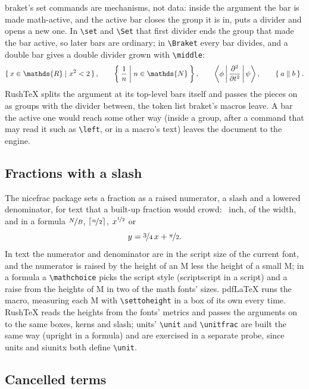 \documentclass{article}
\numberwithin{equation}{section}
\theoremstyle{definition}
\theoremstyle{remark}
\begin{document}
braket's set commands are mechanisms, not data: inside the argument the bar is made
math-active, and the active bar closes the group it is in, puts a divider and opens a new
one. In \verb|\set| and \verb|\Set| that first divider ends the group that made the bar
active, so later bars are ordinary; in \verb|\Braket| every bar divides, and a double bar
gives a double divider grown with \verb|\middle|:
\[ \set{x\in\mathds{R} | x^2<2}, \qquad \Set{\frac{1}{n} | n \in \mathds{N}}, \qquad
   \Braket{\phi | \frac{\partial^2}{\partial t^2} | \psi}, \qquad \Set{a \| b} . \]
RushTeX splits the argument at its top-level bars itself and passes the pieces on as
groups with the divider between, the token list braket's macros leave. A bar the active
one would reach some other way (inside a group, after a command that may read it such as
\verb|\left|, or in a macro's text) leaves the document to the engine.

\subsection{Fractions with a slash}\label{sec:nicefrac}
The nicefrac package sets a fraction as a raised numerator, a slash and a lowered
denominator, for text that a built-up fraction would crowd: ~inch,
 of the width, and in a formula $\nicefrac{N}{B}$,
$\lceil\nicefrac{n}{2}\rceil$, $x^{\nicefrac{1}{2}}$ or
\[ y = \nicefrac{3}{4}\,x + \nicefrac{\pi}{2} . \]
In text the numerator and denominator are in the script size of the current font, and the
numerator is raised by the height of an M less the height of a small M; in a formula a
\verb|\mathchoice| picks the script style (scriptscript in a script) and a raise from the
heights of M in two of the math fonts' sizes. pdfLaTeX runs the macro, measuring each M with
\verb|\settoheight| in a box of its own every time. RushTeX reads the heights from the
fonts' metrics and passes the arguments on to the same boxes, kerns and slash; units'
\verb|\unit| and \verb|\unitfrac| are built the same way (upright in a formula) and are
exercised in a separate probe, since units and siunitx both define \verb|\unit|.

\subsection{Cancelled terms}\label{sec:cancel}
\end{document}
